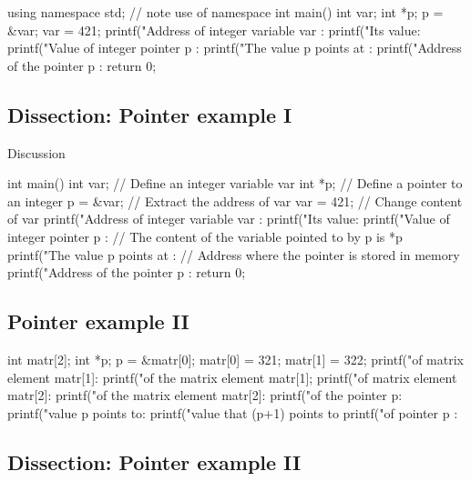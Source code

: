 \documentclass[%
oneside,                 %
final,                   %
10pt]{article}
\begin{document}
\begin{block}{}
\bcppcod
using namespace std; // note use of namespace
int main()
{
  int var;
  int *p;
  p = &var;
  var  = 421;
  printf("Address of integer variable var : %
  printf("Its value: %
  printf("Value of integer pointer p : %
  printf("The value p points at :  %
  printf("Address of the pointer p : %
  return 0;
}
\ecppcod
\end{block}

\subsection{Dissection: Pointer example I}

\begin{block}{Discussion }

\bcppcod
int main()
{
  int var;     // Define an integer variable var
  int *p;      // Define a pointer to an integer
  p = &var;    // Extract the address of var
  var = 421;   // Change content of var
  printf("Address of integer variable var : %
  printf("Its value: %
  printf("Value of integer pointer p : %
  // The content of the variable pointed to by p is *p
  printf("The value p points at :  %
  // Address where the pointer is stored in memory
  printf("Address of the pointer p : %
  return 0;
}
\ecppcod
\end{block}

\subsection{Pointer example II}

\begin{block}{}
\bcppcod
int matr[2];
int *p;
p = &matr[0];
matr[0] = 321;
matr[1] = 322;
printf("\nAddress of matrix element matr[1]: %
printf("\nValue of the  matrix element  matr[1]; %
printf("\nAddress of matrix element matr[2]: %
printf("\nValue of the matrix element  matr[2]: %
printf("\nValue of the pointer p: %
printf("\nThe value p points to: %
printf("\nThe value that (p+1) points to  %
printf("\nAddress of pointer p : %
\ecppcod
\end{block}

\subsection{Dissection: Pointer example II}
\end{document}
